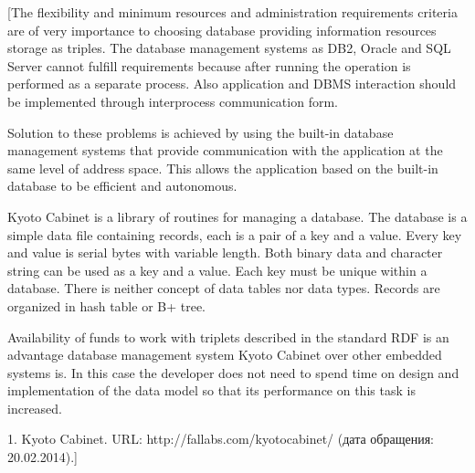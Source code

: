 \documentclass[conference]{IEEEtran}
\begin{document}
[The flexibility and minimum resources and administration requirements criteria are of very importance to choosing database providing information resources storage as triples. The database management systems as DB2, Oracle and SQL Server cannot fulfill requirements because after running the operation is performed as a separate process. Also application and DBMS interaction should be implemented through interprocess communication form.

Solution to these problems is achieved by using the built-in database management systems that provide communication with the application at the same level of address space. This allows the application based on the built-in database to be efficient and autonomous.

Kyoto Cabinet is a library of routines for managing a database. The database is a simple data file containing records, each is a pair of a key and a value. Every key and value is serial bytes with variable length. Both binary data and character string can be used as a key and a value. Each key must be unique within a database. There is neither concept of data tables nor data types. Records are organized in hash table or B+ tree. \cite{b1}

Availability of funds to work with triplets described in the standard RDF is an advantage database management system Kyoto Cabinet over other embedded systems is. In this case the developer does not need to spend time on design and implementation of the data model so that its performance on this task is increased.

1.	Kyoto Cabinet. URL: http://fallabs.com/kyotocabinet/ (дата обращения: 20.02.2014).]

\end{document}
